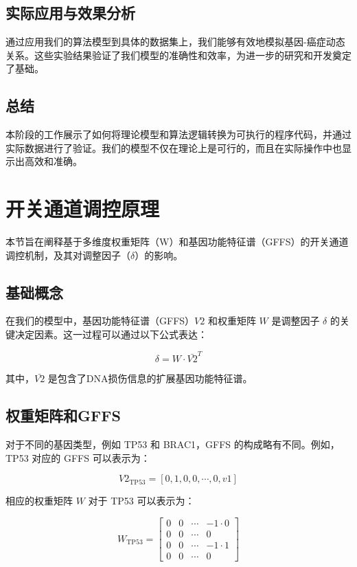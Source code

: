\documentclass{article}
\begin{document}
\subsection{实际应用与效果分析}
通过应用我们的算法模型到具体的数据集上，我们能够有效地模拟基因-癌症动态关系。这些实验结果验证了我们模型的准确性和效率，为进一步的研究和开发奠定了基础。

\subsection{总结}
本阶段的工作展示了如何将理论模型和算法逻辑转换为可执行的程序代码，并通过实际数据进行了验证。我们的模型不仅在理论上是可行的，而且在实际操作中也显示出高效和准确。


\section{开关通道调控原理}

本节旨在阐释基于多维度权重矩阵（W）和基因功能特征谱（GFFS）的开关通道调控机制，及其对调整因子（$\delta$）的影响。

\subsection{基础概念}

在我们的模型中，基因功能特征谱（GFFS）$V2$ 和权重矩阵 $W$ 是调整因子 $\delta$ 的关键决定因素。这一过程可以通过以下公式表达：

\begin{equation}
    \delta = W \cdot \bar{V2}^T
\end{equation}

其中，$\bar{V2}$ 是包含了DNA损伤信息的扩展基因功能特征谱。

\subsection{权重矩阵和GFFS}

对于不同的基因类型，例如 TP53 和 BRAC1，GFFS 的构成略有不同。例如，TP53 对应的 GFFS 可以表示为：

\begin{equation}
    V2_{\text{TP53}} = [0,1,0,0,\cdots,0,v1]
\end{equation}

相应的权重矩阵 $W$ 对于 TP53 可以表示为：

\begin{equation}
    W_{\text{TP53}} = \begin{bmatrix}
    0 & 0 & \cdots & -1 \cdot 0 \\
    0 & 0 & \cdots & 0 \\
    0 & 0 & \cdots & -1 \cdot 1 \\
    0 & 0 & \cdots & 0
    \end{bmatrix}
\end{equation}
\end{document}
